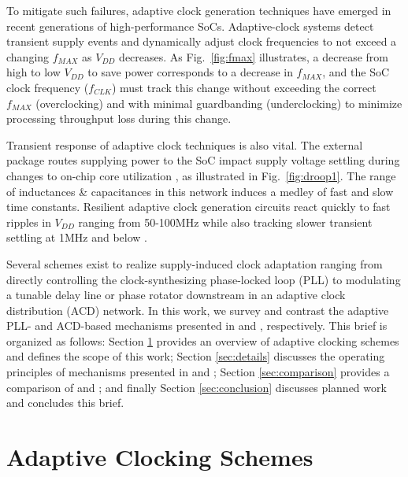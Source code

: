 \documentclass[twoside,9pt,journal,letterpage]{IEEEtran}
\begin{document}
To mitigate such failures, adaptive clock generation techniques have emerged in recent generations of high-performance SoCs\cite{ahmad2017,hashimoto2018,wilcox2015,floyd2017,bowman2016}. Adaptive-clock systems detect transient supply events and dynamically adjust clock frequencies to not exceed a changing $f_{MAX}$ as $V_{DD}$ decreases. As Fig.\ \ref{fig:fmax} illustrates, a decrease from high to low $V_{DD}$ to save power corresponds to a decrease in $f_{MAX}$, and the SoC clock frequency ($f_{CLK}$) must track this change without exceeding the correct $f_{MAX}$ (overclocking) and with minimal guardbanding (underclocking) to minimize processing throughput loss during this change\cite{ahmad2017}. 

Transient response of adaptive clock techniques is also vital. The external package routes supplying power to the SoC impact supply voltage settling during changes to on-chip core utilization \cite{hashimoto2018}, as illustrated in Fig.\ \ref{fig:droop1}. The range of inductances \& capacitances in this network induces a medley of fast and slow time constants. Resilient adaptive clock generation circuits react quickly to fast ripples in $V_{DD}$ ranging from 50-100MHz \cite{hashimoto2018,wilcox2015} while also tracking slower transient settling at 1MHz and below \cite{hashimoto2018,bowman2016,wilcox2015}.

\pubidadjcol

Several schemes exist to realize supply-induced clock adaptation ranging from directly controlling the clock-synthesizing phase-locked loop (PLL)\cite{ahmad2017,hashimoto2018} to modulating a tunable delay line or phase rotator downstream in an adaptive clock distribution (ACD) network\cite{bowman2016,floyd2017,wilcox2015}. In this work, we survey and contrast the adaptive PLL- and ACD-based mechanisms presented in \cite{hashimoto2018} and \cite{wilcox2015}, respectively. This brief is organized as follows: Section \ref{sec:overview} provides an overview of adaptive clocking schemes and defines the scope of this work; Section \ref{sec:details} discusses the operating principles of mechanisms presented in \cite{hashimoto2018} and \cite{wilcox2015}; Section \ref{sec:comparison} provides a comparison of \cite{hashimoto2018} and \cite{wilcox2015}; and finally Section \ref{sec:conclusion} discusses planned work and concludes this brief.

\section{Adaptive Clocking Schemes}
\label{sec:overview}
\end{document}
